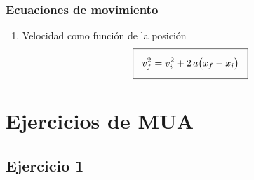 \documentclass[14pt]{beamer}
\begin{document}
\begin{frame}
\frametitle{Ecuaciones de movimiento}
\begin{enumerate}[<+->]
\conti
\item Velocidad como función de la posición
\begin{align*}
\setlength{\fboxsep}{3\fboxsep}\boxed{
v_{f}^{2} = v_{i}^{2} + 2 \, a \big( x_{f} - x_{i}\big)
}
\end{align*}
\end{enumerate}
\end{frame}

\section{Ejercicios de MUA}
\subsection{Ejercicio 1}
\end{document}
